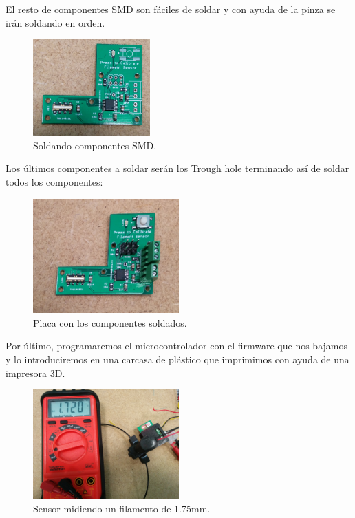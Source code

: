 El resto de componentes SMD son fáciles de soldar y con ayuda de la pinza se irán soldando en orden.
   \begin{figure}[H]
            \centering
            \includegraphics[width=0.4\textwidth]{images/sensor/IMG_20150414_135533.jpg}
            \caption{Soldando componentes SMD.}
            \label{fig:sens_SMD}
    \end{figure}
Los últimos componentes a soldar serán los Trough hole terminando así de soldar todos los componentes:
   \begin{figure}[H]
            \centering
            \includegraphics[width=0.5\textwidth]{images/sensor/IMG_20150417_121941.jpg}
            \caption{Placa con los componentes soldados.}
            \label{fig:sens_SMD}
    \end{figure}

Por último, programaremos el microcontrolador con el firmware que nos bajamos y lo introduciremos en una carcasa de plástico que imprimimos con ayuda de una impresora 3D.
   \begin{figure}[H]
            \centering
            \includegraphics[width=0.5\textwidth]{images/sensor/IMG_20150417_134451.jpg}
            \caption{Sensor midiendo un filamento de 1.75mm.}
            \label{fig:sens_midiendo}
    \end{figure}



